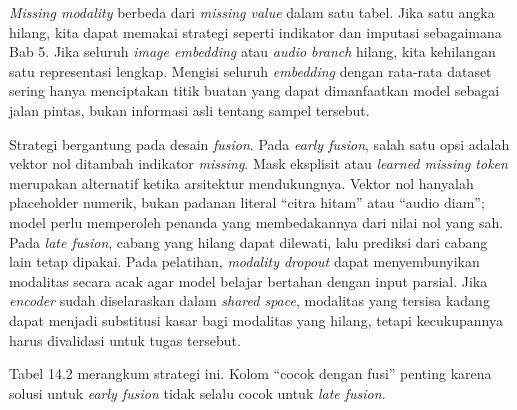 \emph{Missing modality} berbeda dari \emph{missing value} dalam satu tabel. Jika satu angka hilang, kita dapat memakai strategi seperti indikator dan imputasi sebagaimana Bab 5. Jika seluruh \emph{image embedding} atau \emph{audio branch} hilang, kita kehilangan satu representasi lengkap. Mengisi seluruh \emph{embedding} dengan rata-rata dataset sering hanya menciptakan titik buatan yang dapat dimanfaatkan model sebagai jalan pintas, bukan informasi asli tentang sampel tersebut.

Strategi bergantung pada desain \emph{fusion}. Pada \emph{early fusion}, salah satu opsi adalah vektor nol ditambah indikator \emph{missing}. Mask eksplisit atau \emph{learned missing token} merupakan alternatif ketika arsitektur mendukungnya. Vektor nol hanyalah placeholder numerik, bukan padanan literal ``citra hitam'' atau ``audio diam''; model perlu memperoleh penanda yang membedakannya dari nilai nol yang sah. Pada \emph{late fusion}, cabang yang hilang dapat dilewati, lalu prediksi dari cabang lain tetap dipakai. Pada pelatihan, \emph{modality dropout} dapat menyembunyikan modalitas secara acak agar model belajar bertahan dengan input parsial. Jika \emph{encoder} sudah diselaraskan dalam \emph{shared space}, modalitas yang tersisa kadang dapat menjadi substitusi kasar bagi modalitas yang hilang, tetapi kecukupannya harus divalidasi untuk tugas tersebut.

Tabel 14.2 merangkum strategi ini. Kolom ``cocok dengan fusi'' penting karena solusi untuk \emph{early fusion} tidak selalu cocok untuk \emph{late fusion}.


